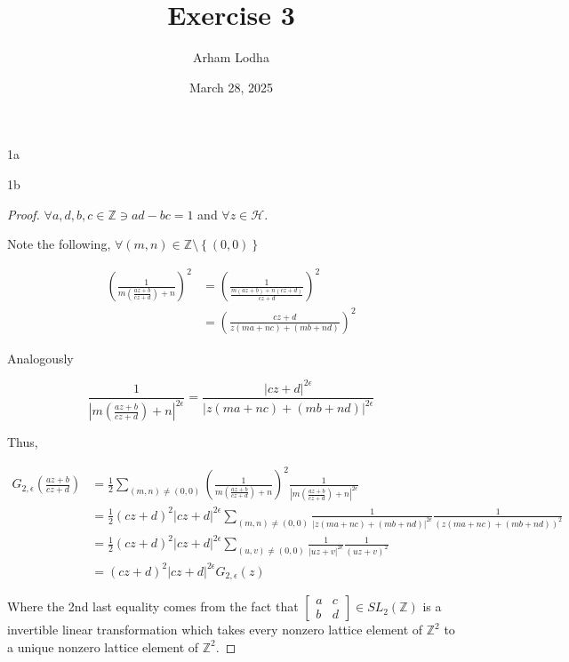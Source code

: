 \documentclass{article}
\newcommand*{\HC}{\mathcal{H}}
\newcommand{\Z}{\mathbb{Z}}
\newcommand{\abs}[1]{\left\lvert #1\right\rvert}
\begin{document}
\title{Exercise 3}
\author{Arham Lodha}%
\date{March 28, 2025}%
\maketitle

\begin{PROB}{1a}\label{Problem 1a.}
\end{PROB}

\begin{PROB}{1b}\label{Problem 1b.}
\end{PROB}
\begin{proof}
    $\forall a, d, b, c \in \Z \ni ad - bc = 1$ and $\forall z \in \HC$. 

    Note the following, $\forall (m, n) \in \Z \setminus \left\{ \left(0,0\right) \right\}$ 

    \begin{align*}
        \left(\frac{1}{m\left(\frac{az + b}{cz + d}\right) + n}\right)^2 &= \left(\frac{1}{\frac{m(az + b) + n(cz + d)}{cz + d}}\right)^2 \\
        &= \left(\frac{cz + d}{z(ma + nc) + (mb + nd)}\right)^2
    \end{align*}

    Analogously

    \[\frac{1}{\abs{m\left(\frac{az + b}{cz + d}\right) + n}^{2\epsilon}} = \frac{\abs{cz + d}^{2 \epsilon}}{\abs{z(ma + nc) + (mb + nd)}^{2 \epsilon}}\]

    Thus,

    \begin{align*}
        G_{2, \epsilon}\left(\frac{az + b}{cz + d}\right) &= \frac{1}{2} \sum_{(m, n) \neq (0,0)} \left(\frac{1}{m\left(\frac{az + b}{cz + d}\right) + n}\right)^2 \frac{1}{\abs{m\left(\frac{az + b}{cz + d}\right) + n}^{2\epsilon}} \\
        &= \frac{1}{2}(cz + d)^2\abs{cz + d}^{2 \epsilon} \sum_{(m, n) \neq (0,0)} \frac{1}{\abs{z(ma + nc) + (mb + nd)}^{2 \epsilon}} \frac{1}{\left(z(ma + nc) + (mb + nd)\right)^2} \\
        &= \frac{1}{2}(cz + d)^2\abs{cz + d}^{2 \epsilon} \sum_{(u, v) \neq (0,0)} \frac{1}{\abs{uz + v}^{2 \epsilon}} \frac{1}{(u z + v)^2} \\
        &= (cz + d)^2\abs{cz + d}^{2 \epsilon} G_{2, \epsilon}(z)
    \end{align*}

    Where the 2nd last equality comes from the fact that $\begin{bmatrix}
        a & c \\ b & d
    \end{bmatrix} \in SL_2(\Z)$ is a invertible linear transformation which takes every nonzero lattice element of $\Z^2$ to a unique nonzero lattice element of $\Z^2$.  
\end{proof}
\end{document}

